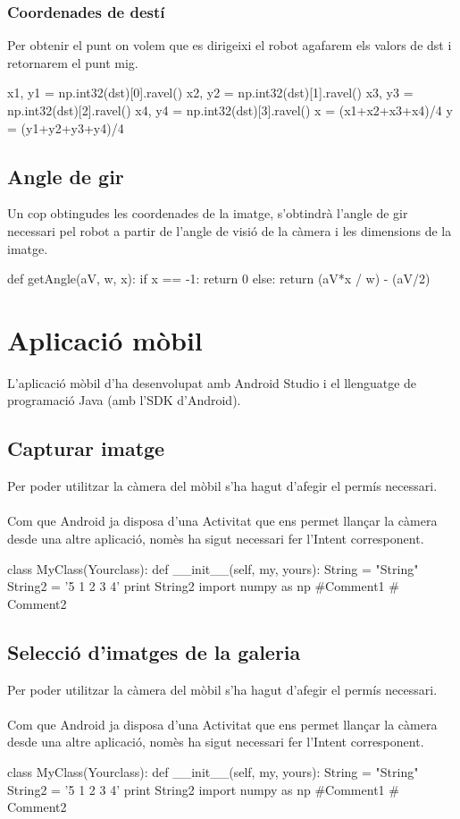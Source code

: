 		\subsubsection{Coordenades de destí}
Per obtenir el punt on volem que es dirigeixi el robot agafarem els valors de dst i retornarem el punt mig.\\
		\begin{python}
		x1, y1 = np.int32(dst)[0].ravel()
		x2, y2 = np.int32(dst)[1].ravel()
		x3, y3 = np.int32(dst)[2].ravel()
		x4, y4 = np.int32(dst)[3].ravel()
		x = (x1+x2+x3+x4)/4
		y = (y1+y2+y3+y4)/4
		\end{python}

	\subsection{Angle de gir}
		Un cop obtingudes les coordenades de la imatge, s'obtindrà l'angle de gir necessari pel robot a partir de l'angle de visió de la càmera i les dimensions de la imatge.\\
		\begin{python}
def getAngle(aV, w, x):
	if x == -1:
		return 0
	else:
		return (aV*x / w) - (aV/2)
		\end{python}

\section{Aplicació mòbil}
	L'aplicació mòbil d'ha desenvolupat amb Android Studio i el llenguatge de programació Java (amb l'SDK d'Android).
	\subsection{Capturar imatge}
		Per poder utilitzar la càmera del mòbil s'ha hagut d'afegir el permís necessari.\\\\
		Com que Android ja disposa d'una Activitat que ens permet llançar la càmera desde una altre aplicació, nomès ha sigut necessari fer l'Intent corresponent.\\
		\begin{python}
class MyClass(Yourclass):
  def __init__(self, my, yours):
    String = "String"
    String2 = '5 1 2 3 4'
    print String2
import numpy as np #Comment1
  # Comment2
		\end{python}
	\subsection{Selecció d'imatges de la galeria}
		Per poder utilitzar la càmera del mòbil s'ha hagut d'afegir el permís necessari.\\\\
		Com que Android ja disposa d'una Activitat que ens permet llançar la càmera desde una altre aplicació, nomès ha sigut necessari fer l'Intent corresponent.\\
		\begin{python}
class MyClass(Yourclass):
  def __init__(self, my, yours):
    String = "String"
    String2 = '5 1 2 3 4'
    print String2
import numpy as np #Comment1
  # Comment2
		\end{python}
